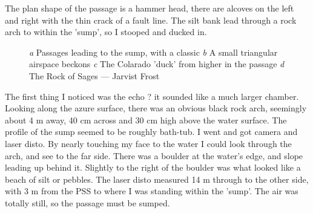 The plan shape of the passage is a hammer head, there are alcoves on the left and right with the thin crack of a fault line. The silt bank lead through a rock arch to within the 'sump', so I stooped and ducked in.
\begin{figure}[t]
\checkoddpage \ifoddpage \forcerectofloat \else \forceversofloat \fi
    \centering
    \begin{subfigure}[t]{0.345\textwidth}
    \centering
        \caption{} \label{Hourglass passage}
    \end{subfigure}
        \hfill
        \begin{subfigure}[t]{0.615\textwidth}
        \centering
        \caption{} \label{Colorado Duck}
    \end{subfigure}
          \vspace{0cm}
          
    \begin{subfigure}[t]{0.615\textwidth}
        \centering
        \caption{} \label{Colarado Sump}
    \end{subfigure}
    \hfill
    \begin{subfigure}[t]{0.345\textwidth}
\centering
{}
\label{Rock of Sages}
\end{subfigure}
    \caption{
    \emph{a} Passages leading to the sump, with a classic  
    \emph{b} A small triangular airspace beckons
    \emph{c}  The Colarado 'duck' from higher in the passage
    \emph{d} The Rock of Sages --- Jarvist Frost}
\end{figure}

The first thing I noticed was the echo ? it sounded like a much larger chamber. Looking along the azure surface, there was an obvious black rock arch, seemingly about 4 m away, 40 cm across and 30 cm high above the water surface. The profile of the sump seemed to be roughly bath-tub.
I went and got camera and laser disto. By nearly touching my face to the water I could look through the arch, and see to the far side. There was a boulder at the water's edge, and slope leading up behind it. Slightly to the right of the boulder was what looked like a beach of silt or pebbles. The laser disto measured 14 m through to the other side, with 3 m from the PSS to where I was standing within the 'sump'. The air was totally still, so the passage must be sumped.

